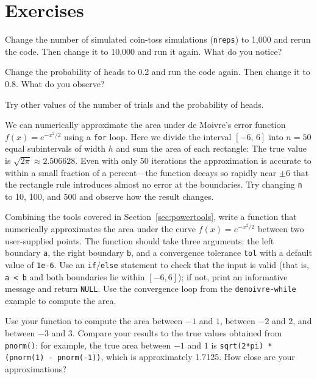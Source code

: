 \section{Exercises}

\begin{exercise}
Change the number of simulated coin-toss simulations (\lstinline{nreps}) to
1,000 and rerun the code. Then change it to 10,000 and run it again.
What do you notice?
\end{exercise}

\begin{exercise}
Change the probability of heads to 0.2 and run the code again. Then change
it to 0.8. What do you observe?
\end{exercise}

\begin{exercise}
Try other values of the number of trials and the probability of heads.
\end{exercise}

\begin{exercise}
We can numerically approximate the area under de Moivre's error function
$f(x) = e^{-x^2/2}$ using a \lstinline{for} loop. Here we divide the interval
$[-6,\, 6]$ into $n = 50$ equal subintervals of width $h$ and sum the
area of each rectangle:
The true value is $\sqrt{2\pi} \approx 2.506628$. Even with only 50 iterations
the approximation is accurate to within a small fraction of a percent---the
function decays so rapidly near $\pm 6$ that the rectangle rule introduces
almost no error at the boundaries. Try changing \lstinline{n} to 10, 100,
and 500 and observe how the result changes.
\end{exercise}

\begin{exercise}
Combining the tools covered in Section~\ref{sec:powertools}, write a
function that numerically approximates the area under the curve
$f(x) = e^{-x^2/2}$ between two user-supplied points. The function
should take three arguments: the left boundary \lstinline{a}, the right
boundary \lstinline{b}, and a convergence tolerance \lstinline{tol}
with a default value of \lstinline{1e-6}. Use an \lstinline{if}/\lstinline{else}
statement to check that the input is valid (that is, \lstinline{a < b} and
both boundaries lie within $[-6, 6]$); if not, print an informative message
and return \lstinline{NULL}. Use the convergence loop from the
\lstinline{demoivre-while} example to compute the area.

Use your function to compute the area between $-1$ and $1$, between
$-2$ and $2$, and between $-3$ and $3$. Compare your results to the
true values obtained from \lstinline{pnorm()}: for example, the true
area between $-1$ and $1$ is
\lstinline{sqrt(2*pi) * (pnorm(1) - pnorm(-1))}, which is approximately
1.7125. How close are your approximations?
\end{exercise}
